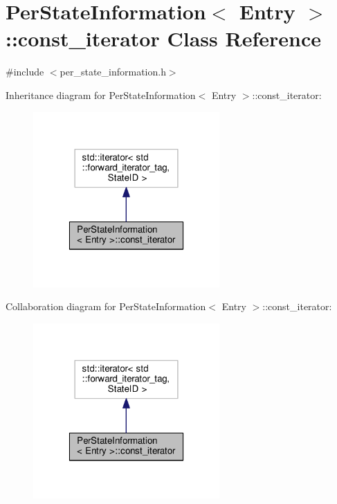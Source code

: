\hypertarget{classPerStateInformation_1_1const__iterator}{\section{Per\-State\-Information$<$ Entry $>$\-:\-:const\-\_\-iterator Class Reference}
\label{classPerStateInformation_1_1const__iterator}
}


{\ttfamily \#include $<$per\-\_\-state\-\_\-information.\-h$>$}



Inheritance diagram for Per\-State\-Information$<$ Entry $>$\-:\-:const\-\_\-iterator\-:
\nopagebreak
\begin{figure}[H]
\begin{center}
\leavevmode
\includegraphics[width=202pt]{classPerStateInformation_1_1const__iterator__inherit__graph}
\end{center}
\end{figure}


Collaboration diagram for Per\-State\-Information$<$ Entry $>$\-:\-:const\-\_\-iterator\-:
\nopagebreak
\begin{figure}[H]
\begin{center}
\leavevmode
\includegraphics[width=202pt]{classPerStateInformation_1_1const__iterator__coll__graph}
\end{center}
\end{figure}
